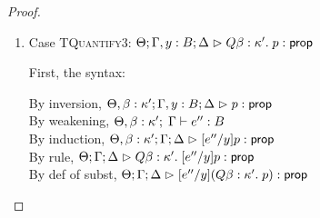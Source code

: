 \begin{proof}
\begin{enumerate}
  For semantics, consider
  $\interp{\judgeA[\Theta; \Gamma; \Delta]
                  {[e''/y](Q x:A.\;p)}{\assert}}\;\theta\;\gamma\;\delta$ 
  \begin{eqnproof}
          {Semantics}
          {Induction}
          {Semantics}
  \end{eqnproof}
  Here, we make use of the fact that $x$ is not free in $e''$, and we silently permute the context as 
  needed. 

\item Case \textsc{TQuantify3}: $\judgeA[\Theta; \Gamma, y:B; \Delta]{Q \beta:\kappa'.\;p}{\assert}$
  
  First, the syntax:
  \begin{tabbedproof}
    \oo By inversion, $\judgeA[\Theta, \beta:\kappa'; \Gamma, y:B; \Delta]{p}{\assert}$ \\
    \oo By weakening, $\judgeE[\Theta, \beta:\kappa']{\Gamma}{e''}{B}$ \\
    \oo By induction, $\judgeA[\Theta, \beta:\kappa'; \Gamma; \Delta]{[e''/y]p}{\assert}$ \\
    \oo By rule, $\judgeA[\Theta; \Gamma; \Delta]
                         {Q \beta:\kappa'.\;[e''/y]p}{\assert}$ \\
    \oo By def of subst, $\judgeA[\Theta; \Gamma; \Delta]
                                 {[e''/y](Q \beta:\kappa'.\;p)}{\assert}$ 
  \end{tabbedproof}


\end{enumerate}
\end{proof}
